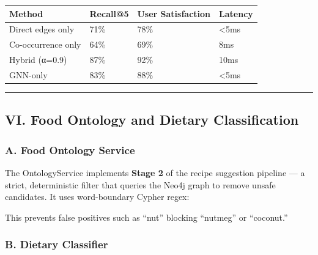 \documentclass[
  10pt,
]{article}
\newenvironment{Shaded}{}{}
\newcommand{\NormalTok}[1]{#1}
\begin{document}
\begin{longtable}[]{@{}llll@{}}
\toprule\noalign{}
Method & Recall@5 & User Satisfaction & Latency \\
\midrule\noalign{}
\endhead
\bottomrule\noalign{}
\endlastfoot
Direct edges only & 71\% & 78\% & \textless5ms \\
Co-occurrence only & 64\% & 69\% & 8ms \\
Hybrid (α=0.9) & 87\% & 92\% & 10ms \\
GNN-only & 83\% & 88\% & \textless5ms \\
\end{longtable}

\begin{center}\rule{0.5\linewidth}{0.5pt}\end{center}

\subsection{VI. Food Ontology and Dietary
Classification}\label{vi.-food-ontology-and-dietary-classification}

\subsubsection{A. Food Ontology Service}\label{a.-food-ontology-service}

The OntologyService implements \textbf{Stage 2} of the recipe suggestion
pipeline --- a strict, deterministic filter that queries the Neo4j graph
to remove unsafe candidates. It uses word-boundary Cypher regex:

\begin{Shaded}
\end{Shaded}

This prevents false positives such as ``nut'' blocking ``nutmeg'' or
``coconut.''

\subsubsection{B. Dietary Classifier}\label{b.-dietary-classifier}
\end{document}
